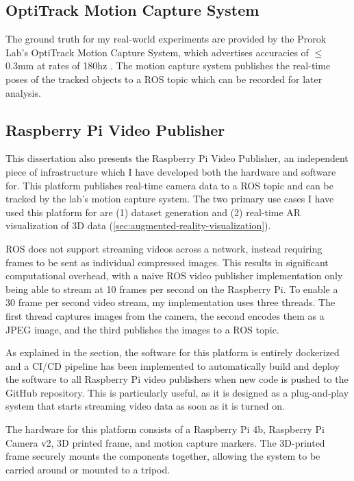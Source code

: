 \subsection{OptiTrack Motion Capture System}
\label{sec:optitrack-motion-capture-system}
The ground truth for my real-world experiments are provided by the Prorok Lab's OptiTrack Motion Capture System, which advertises accuracies of $\leq$0.3mm at rates of 180hz \autocite{OptiTrackForRobotics}. The motion capture system publishes the real-time poses of the tracked objects to a ROS topic which can be recorded for later analysis.

\subsection{Raspberry Pi Video Publisher}
\label{sec:raspberry-pi-video-publisher}
This dissertation also presents the Raspberry Pi Video Publisher, an independent piece of infrastructure which I have developed both the hardware and software for. This platform publishes real-time camera data to a ROS topic and can be tracked by the lab's motion capture system. The two primary use cases I have used this platform for are (1) dataset generation and (2) real-time AR visualization of 3D data (\autoref{sec:augmented-reality-visualization}).

ROS does not support streaming videos across a network, instead requiring frames to be sent as individual compressed images. This results in significant computational overhead, with a naive ROS video publisher implementation only being able to stream at 10 frames per second on the Raspberry Pi. To enable a 30 frame per second video stream, my implementation uses three threads. The first thread captures images from the camera, the second encodes them as a JPEG image, and the third publishes the images to a ROS topic.

As explained in the  section, the software for this platform is entirely dockerized and a CI/CD pipeline has been implemented to automatically build and deploy the software to all Raspberry Pi video publishers when new code is pushed to the GitHub repository. This is particularly useful, as it is designed as a plug-and-play system that starts streaming video data as soon as it is turned on.

The hardware for this platform consists of a Raspberry Pi 4b, Raspberry Pi Camera v2, 3D printed frame, and motion capture markers. The 3D-printed frame securely mounts the components together, allowing the system to be carried around or mounted to a tripod.

